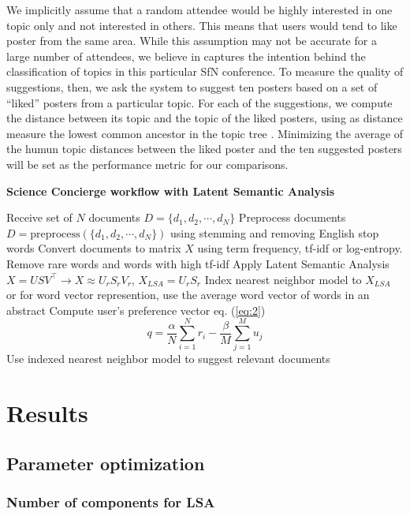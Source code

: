 \documentclass[a4paper]{article}
\begin{document}
We implicitly assume that a random attendee would be highly interested in one topic only and not interested in others. This means that users would tend to like poster from the same area. While this assumption may not be accurate for a large number of attendees, we believe in captures the intention behind the classification of topics in this particular SfN conference. To measure the quality of suggestions, then, we ask the system to suggest ten posters based on a set of “liked” posters from a particular topic. For each of the suggestions, we compute the distance between its topic and the topic of the liked posters, using as distance measure the lowest common ancestor in the topic tree \cite{aho1976finding}. Minimizing the average of the humun topic distances between the liked poster and the ten suggested posters will be set as the performance metric for our comparisons.


\begin{algorithm}
\caption{\textbf{Science Concierge workflow with Latent Semantic Analysis}}
\begin{algorithmic}[1]
\State Receive set of $N$ documents $D = \{d_1, d_2, \cdots, d_N \}$
\State Preprocess documents $D = \mbox{preprocess}(\{d_1, d_2, \cdots, d_N \})$ using stemming and removing English stop words
\State Convert documents to matrix $X$ using term frequency, tf-idf or log-entropy. Remove rare words and words with high tf-idf
\State Apply Latent Semantic Analysis $X = USV^\top \rightarrow X \approx U_r S_r V_r$, $X_{LSA} = U_r S_r$
\State Index nearest neighbor model to $X_{LSA}$ or for word vector represention, use the average word vector of words in an abstract
\State Compute user's preference vector eq. (\ref{eq:2})
$$q = \frac{\alpha}{N} \sum_{i=1}^N r_i - \frac{\beta}{M} \sum_{j=1}^{M} u_j$$
\State Use indexed nearest neighbor model to suggest relevant documents
\label{algo:flow}
\end{algorithmic}
\end{algorithm}

\section{Results}

\subsection{Parameter optimization}

\subsubsection*{Number of components for LSA}
\end{document}
